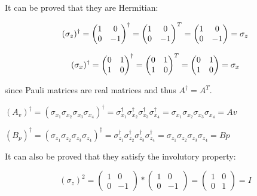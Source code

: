 \documentclass{Configuration_Files/PoliMi3i_thesis}
\begin{document}
It can be proved that they are Hermitian:\newline

\[
\text{$( \sigma_z )^{\dagger}$} = 
\begin{pmatrix}
	1 & 0 \\
	0 & -1
\end{pmatrix} ^\dagger =
\begin{pmatrix}
	1 & 0 \\
	0 & -1
\end{pmatrix}^T =
\begin{pmatrix}
	1 & 0 \\
	0 & -1
\end{pmatrix}
= \text{$ \sigma_z $}
\]


\[
\text{$( \sigma_x )^{\dagger}$} = 
\begin{pmatrix}
	0 & 1 \\
	1 & 0
\end{pmatrix} ^\dagger =
\begin{pmatrix}
	0 & 1 \\
	1 & 0
\end{pmatrix}^T =
\begin{pmatrix}
	0 & 1 \\
	1 & 0
\end{pmatrix}
= \text{$ \sigma_x $}
\]\newline

since Pauli matrices are real matrices and thus $A^{\dagger}=A^T$.

\begin{center}
	$(A_v)^{\dagger} = (\sigma_{x_1} \sigma_{x_2} \sigma_{x_3} \sigma_{x_4})^{\dagger} = \sigma_{x_1}^{\dagger} \sigma_{x_2}^{\dagger} \sigma_{x_3}^{\dagger} \sigma_{x_4}^{\dagger} = \sigma_{x_1} \sigma_{x_2} \sigma_{x_3} \sigma_{x_4} = Av$ \newline
	
	$(B_p)^{\dagger} = (\sigma_{z_1} \sigma_{z_2} \sigma_{z_3} \sigma_{z_4})^{\dagger} = \sigma_{z_1}^{\dagger} \sigma_{z_2}^{\dagger} \sigma_{z_3}^{\dagger} \sigma_{z_4}^{\dagger} = \sigma_{z_1} \sigma_{z_2} \sigma_{z_3} \sigma_{z_4} = Bp$ \newline
\end{center}

It can also be proved that they satisfy the involutory property:\newline

\[
\text{$( \sigma_z )^{2}$} = 
\begin{pmatrix}
	1 & 0 \\
	0 & -1
\end{pmatrix} *
\begin{pmatrix}
	1 & 0 \\
	0 & -1
\end{pmatrix} =
\begin{pmatrix}
	1 & 0 \\
	0 & 1
\end{pmatrix}
= \text{$I$}
\]
\end{document}
